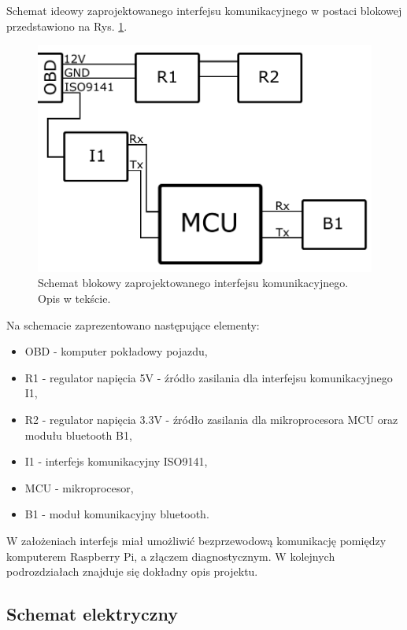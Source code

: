 \documentclass[12pt, twoside]{article} %
\numberwithin{equation}{subsection}
\numberwithin{figure}{section}
\numberwithin{table}{section}
\begin{document}
	Schemat ideowy zaprojektowanego interfejsu komunikacyjnego w postaci blokowej przedstawiono na Rys. \ref{rys_schemat_blokowy_plytki}.
	
	\begin{figure}[!h]
			\centering
			\includegraphics[scale=0.6]{Images/SchematBlokowyPlytki.pdf}
			\caption{Schemat blokowy zaprojektowanego interfejsu komunikacyjnego. Opis w tekście.}
			\label{rys_schemat_blokowy_plytki}
		\end{figure}	
	
	Na schemacie zaprezentowano następujące elementy: 
	
	\begin{itemize}
		\item{OBD - komputer pokładowy pojazdu,}
		\item{R1 - regulator napięcia 5V - źródło zasilania dla interfejsu komunikacyjnego I1,}
		\item{R2 - regulator napięcia 3.3V - źródło zasilania dla mikroprocesora MCU oraz modułu bluetooth B1,}
		\item{I1 - interfejs komunikacyjny ISO9141,}
		\item{MCU - mikroprocesor,}
		\item{B1 - moduł komunikacyjny bluetooth.}
	\end{itemize}
	
	W założeniach interfejs miał umożliwić bezprzewodową komunikację pomiędzy komputerem Raspberry Pi, a złączem diagnostycznym. W kolejnych podrozdziałach znajduje się dokładny opis projektu.	
	
	\newpage
	\subsection{Schemat elektryczny}
	
\end{document}
